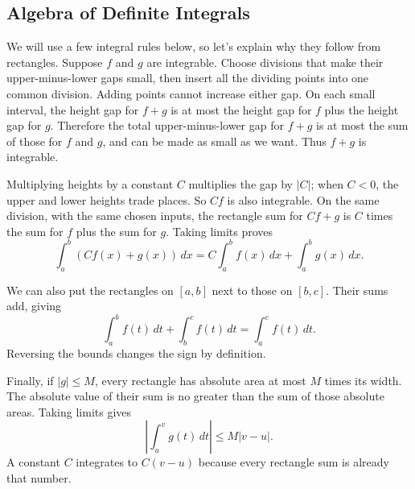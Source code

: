 \subsection*{Algebra of Definite Integrals}

We will use a few integral rules below, so let's explain why they follow
from rectangles. Suppose $f$ and $g$ are integrable. Choose divisions
that make their upper-minus-lower gaps small, then insert all the dividing
points into one common division. Adding points cannot increase either
gap. On each small interval, the height gap for $f+g$ is at most the
height gap for $f$ plus the height gap for $g$. Therefore the total
upper-minus-lower gap for $f+g$ is at most the sum of those for $f$ and
$g$, and can be made as small as we want. Thus $f+g$ is integrable.

Multiplying heights by a constant $C$ multiplies the gap by $|C|$;
when $C<0$, the upper and lower heights trade places. So $Cf$ is also
integrable. On the same division, with the same chosen inputs, the
rectangle sum for $Cf+g$ is $C$ times the sum for $f$ plus the sum for
$g$. Taking limits proves
$$\int_a^b(Cf(x)+g(x))\,dx
=C\int_a^b f(x)\,dx+\int_a^b g(x)\,dx.$$

We can also put the rectangles on $[a,b]$ next to those on $[b,c]$.
Their sums add, giving
$$\int_a^b f(t)\,dt+\int_b^c f(t)\,dt=\int_a^c f(t)\,dt.$$
Reversing the bounds changes the sign by definition.

Finally, if $|g|\leq M$, every rectangle has absolute area at most
$M$ times its width. The absolute value of their sum is no greater than
the sum of those absolute areas. Taking limits gives
$$\left|\int_u^v g(t)\,dt\right|\leq M|v-u|.$$
A constant $C$ integrates to $C(v-u)$ because every rectangle sum is
already that number.


